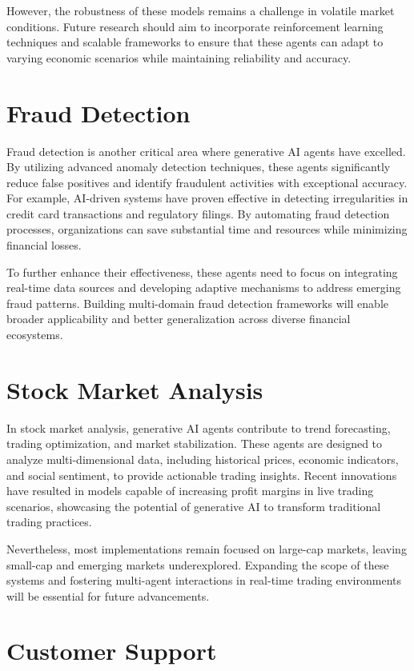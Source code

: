 \documentclass[a4paper,headinclude=on,footinclude=on,12pt,oneside]{scrbook}
\begin{document}
However, the robustness of these models remains a challenge in volatile market conditions. Future research should aim to incorporate reinforcement learning techniques and scalable frameworks to ensure that these agents can adapt to varying economic scenarios while maintaining reliability and accuracy.

\section{Fraud Detection}

Fraud detection is another critical area where generative AI agents have excelled. By utilizing advanced anomaly detection techniques, these agents significantly reduce false positives and identify fraudulent activities with exceptional accuracy. For example, AI-driven systems have proven effective in detecting irregularities in credit card transactions and regulatory filings. By automating fraud detection processes, organizations can save substantial time and resources while minimizing financial losses.

To further enhance their effectiveness, these agents need to focus on integrating real-time data sources and developing adaptive mechanisms to address emerging fraud patterns. Building multi-domain fraud detection frameworks will enable broader applicability and better generalization across diverse financial ecosystems.

\section{Stock Market Analysis}

In stock market analysis, generative AI agents contribute to trend forecasting, trading optimization, and market stabilization. These agents are designed to analyze multi-dimensional data, including historical prices, economic indicators, and social sentiment, to provide actionable trading insights. Recent innovations have resulted in models capable of increasing profit margins in live trading scenarios, showcasing the potential of generative AI to transform traditional trading practices.

Nevertheless, most implementations remain focused on large-cap markets, leaving small-cap and emerging markets underexplored. Expanding the scope of these systems and fostering multi-agent interactions in real-time trading environments will be essential for future advancements.

\section{Customer Support}
\end{document}
